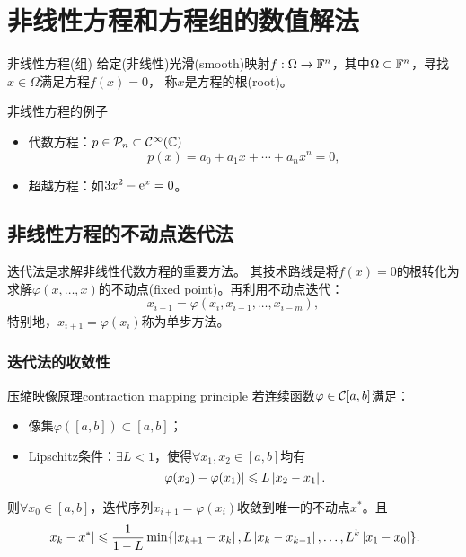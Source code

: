 \chapter{非线性方程和方程组的数值解法}

\begin{definition}
    {非线性方程(组)}{}
    给定(非线性)光滑(smooth)映射$f:\Omega\to\mathbb F^n$，其中$\Omega\subset\mathbb F^n$，寻找$x\in\Omega$满足方程$f(x)=0$，
    称$x$是方程的根(root)。
\end{definition}


\begin{example}
    {非线性方程的例子}{}
    \begin{itemize}
        \item 代数方程：$p\in\mathcal P_n\subset\mathcal C^\infty(\mathbb C)$
        \[
            p(x)=a_0+a_1x+\cdots+a_nx^n=0,
        \]
        \item 超越方程：如$3x^2-\mathop{}\!\mathrm{e}^ x=0$。
    \end{itemize}
\end{example}

\section{非线性方程的不动点迭代法}

迭代法是求解非线性代数方程的重要方法。
其技术路线是将$f(x)=0$的根转化为求解$\varphi(x,\ldots,x)$的不动点(fixed point)。再利用不动点迭代：
\begin{equation}
    x_{i+1}=\varphi(x_i,x_{i-1},\ldots,x_{i-m}),
\end{equation}
特别地，$x_{i+1}=\varphi(x_i)$称为单步方法。

\subsection{迭代法的收敛性}

\begin{theorem}
    {压缩映像原理}{contraction mapping principle}
    若连续函数$\varphi\in\mathcal C[a,b]$满足：
    \begin{itemize}
        \item 像集$\varphi([a,b])\subset[a,b]$；
        \item Lipschitz条件：$\exists L<1$，使得$\forall x_1,x_2\in[a,b]$均有
        \[
            \left\lvert\varphi(x_2)-\varphi(x_1)\right\rvert\leqslant L\left\lvert x_2-x_1\right\rvert.
        \]
    \end{itemize}
    则$\forall x_0\in[a,b]$，迭代序列$x_{i+1}=\varphi(x_i)$收敛到唯一的不动点$x^*$。且
    \begin{equation}
            \left\lvert x_k-x^*\right\rvert\leqslant\frac1{1-L}\min\{\left\lvert x_{k+1}-x_k\right\rvert,L\left\lvert x_k-x_{k-1}\right\rvert,\ldots,L^k\left\lvert x_1-x_0\right\rvert\}.
    \end{equation}
\end{theorem}


